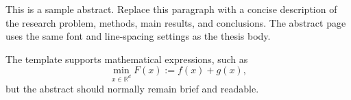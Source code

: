 \begin{abstractpage}
This is a sample abstract. Replace this paragraph with a concise description of the research problem, methods, main results, and conclusions. The abstract page uses the same font and line-spacing settings as the thesis body.

The template supports mathematical expressions, such as
\[
  \min_{x\in\mathbb{R}^d} F(x) := f(x)+g(x),
\]
but the abstract should normally remain brief and readable.

\end{abstractpage}
